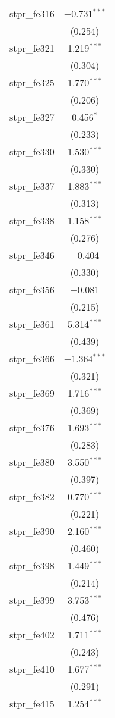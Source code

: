 \begin{table}[!htbp]
\begin{tabular}{@{\extracolsep{5pt}}lc}
  stpr\_fe316 & $-$0.731$^{***}$ \\ 
  & (0.254) \\ 
  stpr\_fe321 & 1.219$^{***}$ \\ 
  & (0.304) \\ 
  stpr\_fe325 & 1.770$^{***}$ \\ 
  & (0.206) \\ 
  stpr\_fe327 & 0.456$^{*}$ \\ 
  & (0.233) \\ 
  stpr\_fe330 & 1.530$^{***}$ \\ 
  & (0.330) \\ 
  stpr\_fe337 & 1.883$^{***}$ \\ 
  & (0.313) \\ 
  stpr\_fe338 & 1.158$^{***}$ \\ 
  & (0.276) \\ 
  stpr\_fe346 & $-$0.404 \\ 
  & (0.330) \\ 
  stpr\_fe356 & $-$0.081 \\ 
  & (0.215) \\ 
  stpr\_fe361 & 5.314$^{***}$ \\ 
  & (0.439) \\ 
  stpr\_fe366 & $-$1.364$^{***}$ \\ 
  & (0.321) \\ 
  stpr\_fe369 & 1.716$^{***}$ \\ 
  & (0.369) \\ 
  stpr\_fe376 & 1.693$^{***}$ \\ 
  & (0.283) \\ 
  stpr\_fe380 & 3.550$^{***}$ \\ 
  & (0.397) \\ 
  stpr\_fe382 & 0.770$^{***}$ \\ 
  & (0.221) \\ 
  stpr\_fe390 & 2.160$^{***}$ \\ 
  & (0.460) \\ 
  stpr\_fe398 & 1.449$^{***}$ \\ 
  & (0.214) \\ 
  stpr\_fe399 & 3.753$^{***}$ \\ 
  & (0.476) \\ 
  stpr\_fe402 & 1.711$^{***}$ \\ 
  & (0.243) \\ 
  stpr\_fe410 & 1.677$^{***}$ \\ 
  & (0.291) \\ 
  stpr\_fe415 & 1.254$^{***}$ \\ 

\end{tabular}
\end{table}
